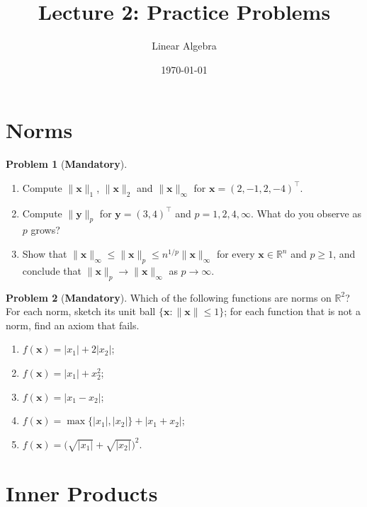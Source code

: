 \documentclass[11pt]{article}
\title{Lecture 2: Practice Problems}
\author{Linear Algebra}
\date{\today}
\theoremstyle{definition}
\newtheorem{problem}{Problem}[section]
\newcommand{\mandatory}{\textcolor{red!70!black}{\textbf{Mandatory}}}
\newcommand{\norm}[1]{\lVert #1 \rVert}
\begin{document}
\maketitle

\section{Norms}

\begin{problem}[\mandatory]\label{pr:norms-compute}
    \begin{enumerate}[label=(\alph*)]
        \item Compute $\norm{\mathbf{x}}_1$, $\norm{\mathbf{x}}_2$ and $\norm{\mathbf{x}}_\infty$ for $\mathbf{x} = (2, -1, 2, -4)^\top$.
        \item Compute $\norm{\mathbf{y}}_p$ for $\mathbf{y} = (3, 4)^\top$ and $p = 1, 2, 4, \infty$. What do you observe as $p$ grows?
        \item Show that $\norm{\mathbf{x}}_\infty \leq \norm{\mathbf{x}}_p \leq n^{1/p} \norm{\mathbf{x}}_\infty$ for every $\mathbf{x} \in \mathbb{R}^n$ and $p \geq 1$, and conclude that $\norm{\mathbf{x}}_p \to \norm{\mathbf{x}}_\infty$ as $p \to \infty$.
    \end{enumerate}
\end{problem}

\begin{problem}[\mandatory]\label{pr:which-norms}
    Which of the following functions are norms on $\mathbb{R}^2$? For each norm, sketch its unit ball $\{\mathbf{x} : \norm{\mathbf{x}} \leq 1\}$; for each function that is not a norm, find an axiom that fails.
    \begin{enumerate}[label=(\alph*)]
        \item $f(\mathbf{x}) = |x_1| + 2|x_2|$;
        \item $f(\mathbf{x}) = |x_1| + x_2^2$;
        \item $f(\mathbf{x}) = |x_1 - x_2|$;
        \item $f(\mathbf{x}) = \max\{|x_1|, |x_2|\} + |x_1 + x_2|$;
        \item $f(\mathbf{x}) = \big(\sqrt{|x_1|} + \sqrt{|x_2|}\big)^2$.
    \end{enumerate}
\end{problem}

\section{Inner Products}
\end{document}
